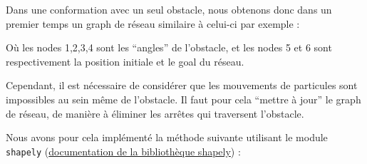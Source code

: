 \documentclass[
]{article}
\begin{document}
Dans une conformation avec un seul obstacle, nous obtenons donc dans un
premier temps un graph de réseau similaire à celui-ci par exemple :

Où les nodes 1,2,3,4 sont les ``angles'' de l'obstacle, et les nodes 5
et 6 sont respectivement la position initiale et le goal du réseau.

Cependant, il est nécessaire de considérer que les mouvements de
particules sont impossibles au sein même de l'obstacle. Il faut pour
cela ``mettre à jour'' le graph de réseau, de manière à éliminer les
arrêtes qui traversent l'obstacle.

Nous avons pour cela implémenté la méthode suivante utilisant le module
\texttt{shapely}
(\href{https://shapely.readthedocs.io/en/stable/manual.html}{documentation
de la bibliothèque shapely}) :
\end{document}
